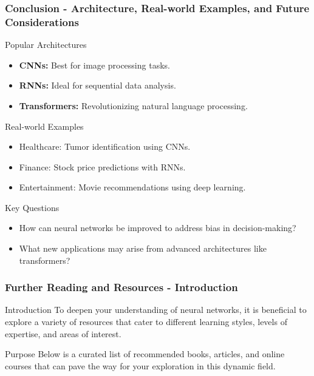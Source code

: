\documentclass[aspectratio=169]{beamer}
\begin{document}
\begin{frame}[fragile]
    \frametitle{Conclusion - Architecture, Real-world Examples, and Future Considerations}
    \begin{block}{Popular Architectures}
        \begin{itemize}
            \item \textbf{CNNs:} Best for image processing tasks.
            \item \textbf{RNNs:} Ideal for sequential data analysis.
            \item \textbf{Transformers:} Revolutionizing natural language processing.
        \end{itemize}
    \end{block}

    \begin{block}{Real-world Examples}
        \begin{itemize}
            \item Healthcare: Tumor identification using CNNs.
            \item Finance: Stock price predictions with RNNs.
            \item Entertainment: Movie recommendations using deep learning.
        \end{itemize}
    \end{block}

    \begin{block}{Key Questions}
        \begin{itemize}
            \item How can neural networks be improved to address bias in decision-making?
            \item What new applications may arise from advanced architectures like transformers?
        \end{itemize}
    \end{block}
\end{frame}

\begin{frame}[fragile]
    \frametitle{Further Reading and Resources - Introduction}
    \begin{block}{Introduction}
        To deepen your understanding of neural networks, it is beneficial to explore a variety of resources that cater to different learning styles, levels of expertise, and areas of interest. 
    \end{block}
    \begin{block}{Purpose}
        Below is a curated list of recommended books, articles, and online courses that can pave the way for your exploration in this dynamic field.
    \end{block}
\end{frame}
\end{document}
